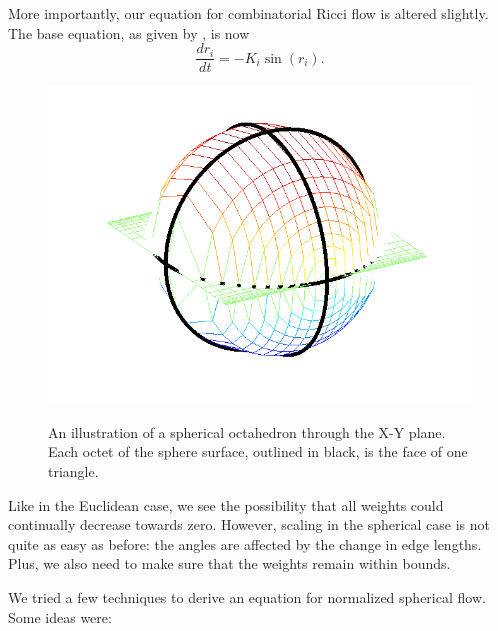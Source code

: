 \documentclass[12pt]{article}
\begin{document}
\noindent More importantly, our equation for combinatorial Ricci flow is altered slightly. The base equation, as given by \cite{chowluo}, is now 
\begin{equation}
\label{SRiccif}
\frac{dr_i}{dt} = -K_i\sin(r_i).
\end{equation}

\begin{figure}
\centering
\includegraphics[scale = 0.6]{Pictures/octosph.png}
\label{OctoSph}
\caption{An illustration of a spherical octahedron through the X-Y plane. Each octet of the sphere surface, outlined in black, is the face of one triangle.} 
\end{figure}

\noindent Like in the Euclidean case, we see the possibility that all weights could continually decrease towards zero. However, scaling in the spherical case is not quite as easy as before: the angles are affected by the change in edge lengths. Plus, we also need to make sure that the weights remain within bounds.\newline

\noindent We tried a few techniques to derive an equation for normalized spherical flow. Some ideas were:
\end{document}
